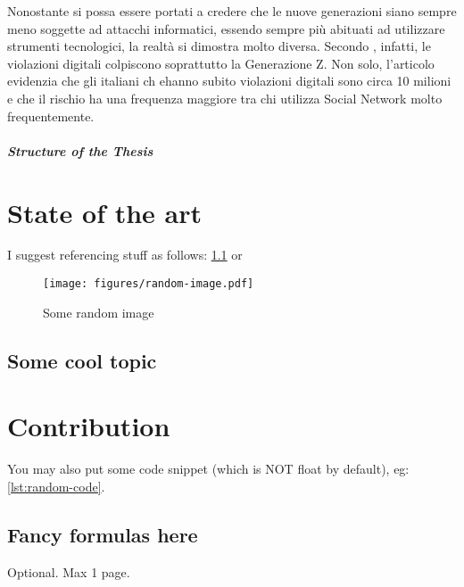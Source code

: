 \documentclass[12pt,a4paper,openright,twoside]{book}
\begin{document}
Nonostante si possa essere portati a credere che le nuove generazioni siano sempre meno soggette  ad attacchi informatici, essendo sempre più abituati ad utilizzare strumenti tecnologici, la realtà si dimostra molto diversa.
Secondo \cite{unipol2022}, infatti, le violazioni digitali colpiscono soprattutto la Generazione Z.
Non solo, l'articolo evidenzia che gli italiani ch ehanno subito violazioni digitali sono circa 10 milioni e che il rischio ha una frequenza maggiore tra chi utilizza Social Network molto frequentemente.




\paragraph{Structure of the Thesis}

\chapter{State of the art}

I suggest referencing stuff as follows: \cref{fig:random-image} or 

\begin{figure}
    \centering
    \texttt{[image: figures/random-image.pdf]}
    \caption{Some random image}
    \label{fig:random-image}
\end{figure}

\section{Some cool topic}

\chapter{Contribution}

You may also put some code snippet (which is NOT float by default), eg: \cref{lst:random-code}.




\section{Fancy formulas here}


\backmatter




\begin{acknowledgements} %
Optional. Max 1 page.
\end{acknowledgements}
\end{document}
